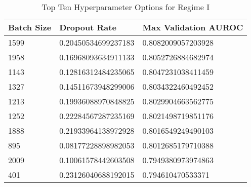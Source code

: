 \begin{table}[H]
    \centering
    \begin{tabular}{@{}lll@{}}
    \toprule
    Batch Size & Dropout Rate         & Max Validation AUROC \\ \midrule
    1599       & 0.20450534699237183  & 0.8082009057203928   \\
    1958       & 0.16968093634911133  & 0.8052726884682974   \\
    1143       & 0.12816312484235065  & 0.8047231038411459   \\
    1327       & 0.14511673948299006  & 0.8034322460492452   \\
    1213       & 0.19936088970848825  & 0.8029904663562775   \\
    1252       & 0.22284567287235169  & 0.8021498719851176   \\
    1888       & 0.21933964138972928  & 0.8016549249490103   \\
    895        & 0.08177228898982053  & 0.8012685179710388   \\
    2009       & 0.10061578442603508  & 0.7949380973974863   \\
    401        & 0.23126040688192015  & 0.794610470533371    \\ \bottomrule
    \end{tabular}
    \caption{Top Ten Hyperparameter Options for Regime I}\label{tab:regime-I-top-ten}
\end{table}